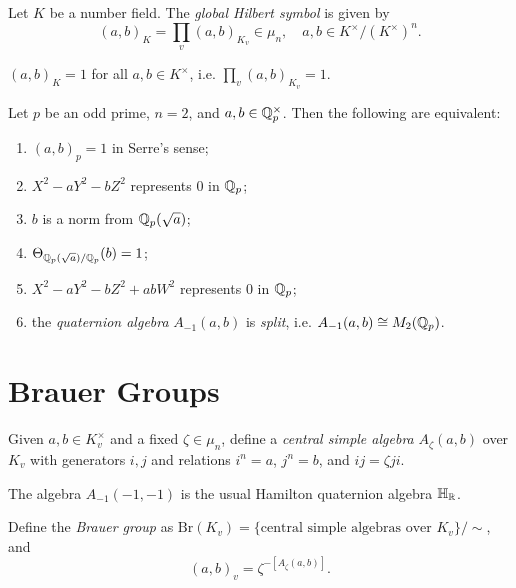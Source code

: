 \begin{definition}
  Let $K$ be a number field.
  The \emph{global Hilbert symbol} is given
  by
  \[
    (a, b)_K = \prod_v (a, b)_{K_v} \in \mu_n,
  \quad a, b \in K^\times / (K^\times)^n.
  \]
\end{definition}

\begin{theorem}
  $(a, b)_K = 1$ for all $a, b \in K^\times$,
  i.e. $\prod_v (a, b)_{K_v} = 1$.
\end{theorem}

\begin{prop}
  Let $p$ be an odd prime, $n = 2$, and
  $a, b \in \mathbb{Q}_p^\times$. Then the
  following are equivalent:
  \begin{enumerate}
    \item $(a, b)_p = 1$ in Serre's sense;
    \item $X^2 - aY^2 - bZ^2$ represents $0$
      in $\mathbb{Q}_p$;
    \item $b$ is a norm from $\mathbb{Q}_p(\sqrt{a})$;
    \item $\Theta_{\mathbb{Q}_p(\sqrt{a}) / \mathbb{Q}_p}(b) = 1$;
    \item $X^2 - aY^2 - bZ^2 + abW^2$
      represents $0$ in $\mathbb{Q}_p$;
    \item the \emph{quaternion algebra}
      $A_{-1}(a, b)$ is \emph{split}, i.e.
      $A_{-1}(a, b) \cong M_2(\mathbb{Q}_p)$.
  \end{enumerate}
\end{prop}

\section{Brauer Groups}

\begin{definition}
  Given $a, b \in K_v^\times$ and a fixed
  $\zeta \in \mu_n$, define a
  \emph{central simple algebra} $A_\zeta(a, b)$
  over $K_v$ with generators
  $i, j$ and relations $i^n = a$, $j^n = b$,
  and $ij = \zeta ji$.
\end{definition}

\begin{example}
  The algebra $A_{-1}(-1, -1)$ is the
  usual Hamilton quaternion algebra
  $\mathbb{H}_{\mathbb{R}}$.
\end{example}

\begin{definition}
  Define the \emph{Brauer group} as
  $\mathrm{Br}(K_v) = \{\text{central simple algebras over $K_v$}\} / {\sim}$, and
  \[
    (a, b)_v = \zeta^{-[A_\zeta(a, b)]}.
  \]
\end{definition}

